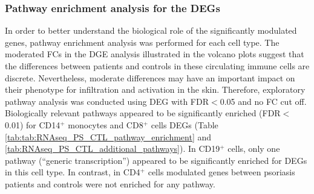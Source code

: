 \subsubsection{Pathway enrichment analysis for the DEGs}

In order to better understand the biological role of the significantly modulated genes, pathway enrichment analysis was performed for each cell type. The moderated FCs in the DGE analysis illustrated in the volcano plots suggest that the differences between patients and controls in these circulating immune cells are discrete. Nevertheless, moderate differences may have an important impact on their phenotype for infiltration and activation in the skin. Therefore, exploratory pathway analysis was conducted using DEG with FDR$<$0.05 and no FC cut off. Biologically relevant pathways appeared to be significantly enriched (FDR$<$0.01) for CD14$^+$ monocytes and CD8$^+$ cells DEGs (Table \ref{tab:tab:RNAseq_PS_CTL_pathway_enrichment} and \ref{tab:RNAseq_PS_CTL_additional_pathways}). In CD19$^+$ cells, only one pathway (“generic transcription”) appeared to be significantly enriched for DEGs in this cell type. In contrast, in CD4$^+$ cells modulated genes between psoriasis patients and controls were not enriched for any pathway. 

